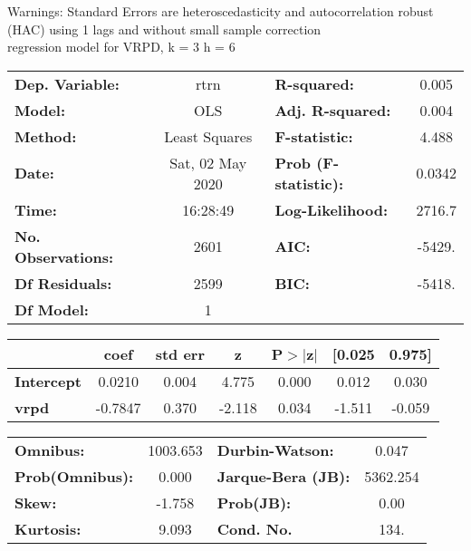Warnings: \newline
 [1] Standard Errors are heteroscedasticity and autocorrelation robust (HAC) using 1 lags and without small sample correction\\ 

regression model for VRPD, k = 3 h = 6\begin{center}
\begin{tabular}{lclc}
\toprule
\textbf{Dep. Variable:}    &       rtrn       & \textbf{  R-squared:         } &     0.005   \\
\textbf{Model:}            &       OLS        & \textbf{  Adj. R-squared:    } &     0.004   \\
\textbf{Method:}           &  Least Squares   & \textbf{  F-statistic:       } &     4.488   \\
\textbf{Date:}             & Sat, 02 May 2020 & \textbf{  Prob (F-statistic):} &   0.0342    \\
\textbf{Time:}             &     16:28:49     & \textbf{  Log-Likelihood:    } &    2716.7   \\
\textbf{No. Observations:} &        2601      & \textbf{  AIC:               } &    -5429.   \\
\textbf{Df Residuals:}     &        2599      & \textbf{  BIC:               } &    -5418.   \\
\textbf{Df Model:}         &           1      & \textbf{                     } &             \\
\bottomrule
\end{tabular}
\begin{tabular}{lcccccc}
                   & \textbf{coef} & \textbf{std err} & \textbf{z} & \textbf{P$> |$z$|$} & \textbf{[0.025} & \textbf{0.975]}  \\
\midrule
\textbf{Intercept} &       0.0210  &        0.004     &     4.775  &         0.000        &        0.012    &        0.030     \\
\textbf{vrpd}      &      -0.7847  &        0.370     &    -2.118  &         0.034        &       -1.511    &       -0.059     \\
\bottomrule
\end{tabular}
\begin{tabular}{lclc}
\textbf{Omnibus:}       & 1003.653 & \textbf{  Durbin-Watson:     } &    0.047  \\
\textbf{Prob(Omnibus):} &   0.000  & \textbf{  Jarque-Bera (JB):  } & 5362.254  \\
\textbf{Skew:}          &  -1.758  & \textbf{  Prob(JB):          } &     0.00  \\
\textbf{Kurtosis:}      &   9.093  & \textbf{  Cond. No.          } &     134.  \\
\bottomrule
\end{tabular}
\end{center}

